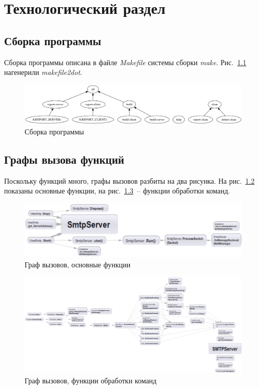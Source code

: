 \documentclass[a4paper,12pt]{report}
\begin{document}
\chapter{Технологический раздел}

\section{Сборка программы}

Сборка программы описана в файле \textit{Makefile} системы сборки \textit{make}. Рис.~\ref{fig:make} нагенерили \textit{makefile2dot}.

\begin{figure}
\centering
\includegraphics[width=\textwidth]{include/make.png}
\caption{Сборка программы}
\label{fig:make}
\end{figure}

\section{Графы вызова функций}

Поскольку функций много, графы вызовов разбиты на два рисунка. На рис.~\ref{fig:cflow01} показаны основные функции, на рис.~\ref{fig:cflow02}~-- функции обработки команд. 

\begin{figure}
\centering
\includegraphics[width=\textwidth]{include/cflow1.png}
\caption{Граф вызовов, основные функции}
\label{fig:cflow01}
\end{figure}

\begin{figure}
\centering
\includegraphics[width=\textwidth]{include/cflow2.png}
\caption{Граф вызовов, функции обработки команд}
\label{fig:cflow02}
\end{figure}
\end{document}
